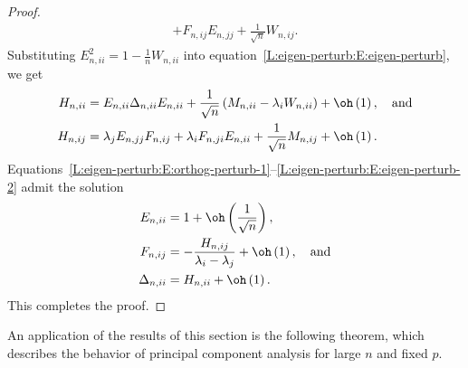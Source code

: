 \begin{proof}
\begin{subequations}
\begin{align}
         + 
         F_{n,ij} E_{n,jj} 
         + 
         \frac{1}{\sqrt{n}} W_{n,ij}.
         \label{L:eigen-perturb:E:orthog-perturb-2}
\end{align}
\end{subequations}
Substituting
\(
    E_{n,ii}^2 = 1 - \frac{1}{n} W_{n,ii}
\)
into equation~\eqref{L:eigen-perturb:E:eigen-perturb}, we get
\begin{subequations}
\begin{align}
    H_{n,ii} 
        &= E_{n,ii} \Delta_{n,ii} E_{n,ii}
           + 
           \frac{1}{\sqrt{n}} \left(
                M_{n,ii} - \lambda_i W_{n,ii}
           \right)
           +
           \oh \left( 1 \right), \quad \text{and} 
           \label{L:eigen-perturb:E:eigen-perturb-1} \\
    H_{n,ij}
        &= \lambda_j E_{n,jj} F_{n,ij}
           +
           \lambda_i F_{n,ji} E_{n,ii} 
           +
           \frac{1}{\sqrt{n}} M_{n,ij}
           +
           \oh \left( 1 \right).
           \label{L:eigen-perturb:E:eigen-perturb-2} 
\end{align}
\end{subequations}
Equations~\eqref{L:eigen-perturb:E:orthog-perturb-1}--\eqref{L:eigen-perturb:E:eigen-perturb-2} admit the solution
\begin{subequations}
\begin{align}
    E_{n,ii} 
        &= 1 + \oh\left(\frac{1}{\sqrt{n}}\right), \\
    F_{n,ij}
        &= -
           \frac{ H_{n,ij} }
                { \lambda_i - \lambda_j }
           +
           \oh \left( 1 \right), \quad \text{and} \\
    \Delta_{n,ii}
        &= H_{n,ii} + \oh\left( 1 \right). 
\end{align}
\end{subequations}
This completes the proof.
\end{proof}

An application of the results of this section is the following theorem, which describes the behavior of principal component analysis for large $n$ and fixed $p$.


